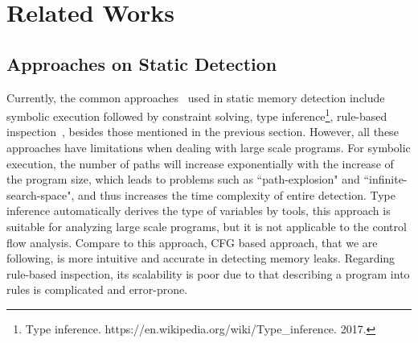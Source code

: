 \section{Related Works}\label{sec:related}

\subsection{Approaches on Static Detection}
Currently, the common approaches~\cite{YZ04} used in static memory detection include symbolic execution followed by constraint solving, type inference\footnote{Type inference. https://en.wikipedia.org/wiki/Type\_inference. 2017.}, rule-based inspection~\cite{SJP05}, besides those mentioned in the previous section. However, all these approaches have limitations when dealing with large scale programs. For symbolic execution, the number of paths will increase exponentially with the increase of the program size, which leads to problems such as ``path-explosion" and ``infinite-search-space", and thus increases the time complexity of entire detection. Type inference automatically derives the type of variables by tools, this approach is suitable for analyzing large scale programs, but it is not applicable to the control flow analysis. Compare to this approach, CFG based approach, that we are following, is more intuitive and accurate in detecting memory leaks. Regarding rule-based inspection, its scalability is poor due to that describing a program into rules is complicated and error-prone. 

